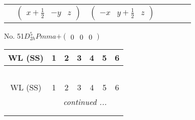 \documentclass[fleqn,9pt,landscape]{jsarticle}
\begin{document}
\begin{center}
\begin{longtable}{ccccccc}
& $ \begin{pmatrix} x + \frac{1}{2} & - y & z \end{pmatrix} $ & $ \begin{pmatrix} - x & y + \frac{1}{2} & z \end{pmatrix} $ & $  $ & $  $ & $  $ & $  $ \\
\end{longtable}
\end{center}
\newpage
No. 51\quad$D_{2h}^{5}$\quad$Pmma$\quad[ orthorhombic ]\quad$+\begin{pmatrix} 0 & 0 & 0 \end{pmatrix}$
\begin{center}
\renewcommand{\arraystretch}{1.2}
\begin{longtable}{ccccccc}
 \hline \hline
WL (SS) & 1 & 2 & 3 & 4 & 5 & 6 \\ \hline \endfirsthead

\multicolumn{6}{l}{\tablename\ \thetable{}} \\
 \hline \hline
WL (SS) & 1 & 2 & 3 & 4 & 5 & 6 \\ \hline \endhead

 \hline \hline
\multicolumn{6}{r}{\footnotesize\it continued ...} \\ \endfoot

 \hline \hline
\multicolumn{6}{r}{} \\ \endlastfoot


\end{longtable}
\end{center}
\end{document}
